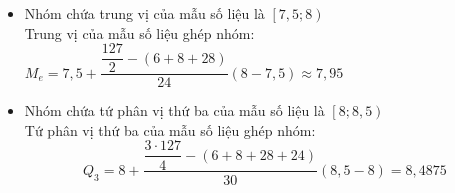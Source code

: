 \begin{ex}
{\begin{itemize}
			$${{M}_{0}}=8+\dfrac{30-24}{\left( 30-24 \right)+\left( 30-12  \right)}\left( 8{,}5-8 \right)=8{,}125$$
			 \item
			Nhóm chứa trung vị của mẫu  số liệu là $\left[7{,}5;8 \right)$\\
			Trung vị của mẫu số  liệu ghép nhóm:
			${{M}_{e}}=7{,}5+\dfrac{\dfrac{127}{2}-\left( 6+8+28 \right)}{24}\left(  8-7{,}5 \right)\approx 7{,}95$
			\item Nhóm chứa tứ phân vị thứ ba  của mẫu số liệu là $\left[8;8{,}5 \right)$\\
			Tứ phân vị  thứ ba của mẫu số liệu ghép nhóm:
			$${{Q}_{3}}=8+\dfrac{\dfrac{3\cdot127}{4}-\left(  6+8+28+24 \right)}{30}\left( 8{,}5-8 \right)=8{,}4875$$
		\end{itemize}
	 }
\end{ex}

